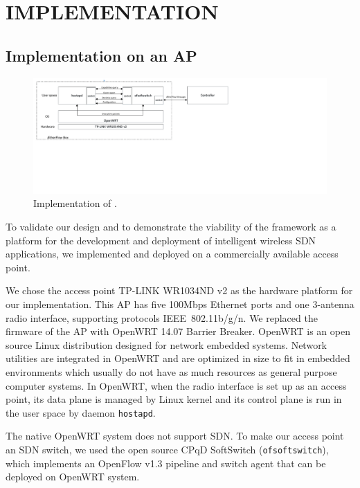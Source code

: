 \chapter{\uppercase {\aetherflow Implementation}}
\label{sec:impl}

\section{Implementation on an AP}


\begin{figure}[t]
\centering
\includegraphics[trim=.2in 3.75in 7in .2in, clip, width=1.0\textwidth]{figures/implementation}
\caption{Implementation of \aetherflow.}
\label{fig:impl}
\end{figure}

To validate our design and to demonstrate the viability of the \aetherflow
framework as a platform for the development and deployment of intelligent
wireless SDN applications, we implemented and deployed \aetherflow on a commercially
available access point. 

We chose the access point TP-LINK WR1034ND v2 as the hardware 
platform for our implementation.  This AP has five 100Mbps Ethernet ports and one
3-antenna radio interface, supporting protocols IEEE~802.11b/g/n.  We replaced
the firmware of the AP with OpenWRT 14.07 Barrier Breaker. OpenWRT
is an open source Linux distribution designed for network embedded systems.
Network utilities are integrated in OpenWRT and are optimized in size to fit in
embedded environments which usually do not have as much resources as general
purpose computer systems. In OpenWRT, when the radio interface is set up as an
access point, its data plane is managed by Linux kernel and its control plane
is run in the user space by daemon \texttt{hostapd}. 

The native OpenWRT system does not support SDN. To make our access point an SDN
switch, we used the open source CPqD SoftSwitch (\texttt{ofsoftswitch}), which implements an OpenFlow v1.3 pipeline and switch
agent that can be deployed on OpenWRT system.

